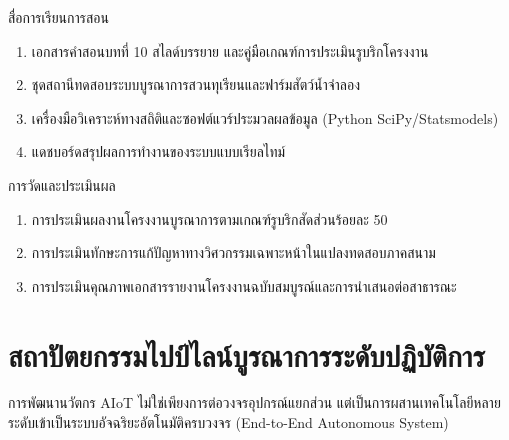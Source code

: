 \begin{planbox}{สื่อการเรียนการสอน}
\begin{enumerate}[topsep=2pt, itemsep=1pt, partopsep=0pt, parsep=0pt, leftmargin=1.5em]
    \item เอกสารคำสอนบทที่ 10 สไลด์บรรยาย และคู่มือเกณฑ์การประเมินรูบริกโครงงาน
    \item ชุดสถานีทดสอบระบบบูรณาการสวนทุเรียนและฟาร์มสัตว์น้ำจำลอง
    \item เครื่องมือวิเคราะห์ทางสถิติและซอฟต์แวร์ประมวลผลข้อมูล (Python SciPy/Statsmodels)
    \item แดชบอร์ดสรุปผลการทำงานของระบบแบบเรียลไทม์
\end{enumerate}
\end{planbox}

\begin{planbox}{การวัดและประเมินผล}
\begin{enumerate}[topsep=2pt, itemsep=1pt, partopsep=0pt, parsep=0pt, leftmargin=1.5em]
    \item การประเมินผลงานโครงงานบูรณาการตามเกณฑ์รูบริกสัดส่วนร้อยละ 50
    \item การประเมินทักษะการแก้ปัญหาทางวิศวกรรมเฉพาะหน้าในแปลงทดสอบภาคสนาม
    \item การประเมินคุณภาพเอกสารรายงานโครงงานฉบับสมบูรณ์และการนำเสนอต่อสาธารณะ
\end{enumerate}
\end{planbox}

\clearpage

\section{สถาปัตยกรรมไปป์ไลน์บูรณาการระดับปฏิบัติการ}

การพัฒนานวัตกร AIoT ไม่ใช่เพียงการต่อวงจรอุปกรณ์แยกส่วน แต่เป็นการผสานเทคโนโลยีหลายระดับเข้าเป็นระบบอัจฉริยะอัตโนมัติครบวงจร (End-to-End Autonomous System)

